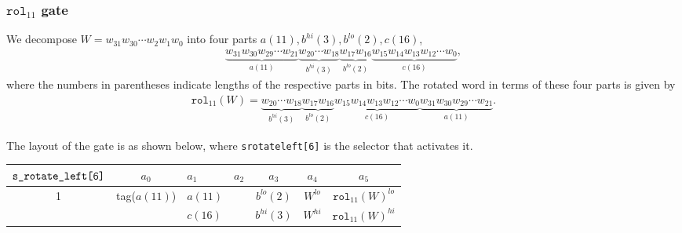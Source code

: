 \documentclass[10pt]{article}
\begin{document}
\subsubsection{$\texttt{rol}_{11}$ gate}%
\label{sec:rol_11_gate}
We decompose $W = w_{31}w_{30}\cdots w_2w_1w_0$ into four parts $a(11), b^{hi}(3), b^{lo}(2), c(16)$,
\begin{align*}
  \underbrace{w_{31}w_{30}w_{29}\cdots w_{21}}_{a(11)} \underbrace{w_{20}\cdots w_{18}}_{b^{hi}(3)}
  \underbrace{w_{17} w_{16}}_{b^{lo}(2)} \underbrace{w_{15}w_{14}w_{13}w_{12}\cdots w_{0}}_{c(16)},
\end{align*}
where the numbers in parentheses indicate lengths of the respective parts in bits. The rotated word in terms of these four parts is given by
\begin{align*}
  \texttt{rol}_{11}(W) = 
  \underbrace{w_{20}\cdots w_{18}}_{b^{hi}(3)} \underbrace{w_{17} w_{16}}_{b^{lo}(2)}
  \underbrace{w_{15}w_{14}w_{13}w_{12}\cdots w_{0}}_{c(16)}\underbrace{w_{31}w_{30}w_{29}\cdots w_{21}}_{a(11)}.
\end{align*}

The layout of the gate is as shown below, where \texttt{s\textunderscore rotate\textunderscore left[6]} is the selector that activates it.

\begin{center}
  \begin{tabular}{c|c|l|l|c|c|c}
    $\texttt{s\textunderscore rotate\textunderscore left[6]}$ & $a_0$ & $a_1$ & $a_2$ & $a_3$ & $a_4$ & $a_5$ \\ \hline
    1  & tag($a(11)$) & $a(11)$ &                        & $b^{lo}(2)$ & $W^{lo}$  & $\texttt{rol}_{11}(W)^{lo}$  \\ 
       &              & $c(16)$ &                        & $b^{hi}(3)$ & $W^{hi}$  & $\texttt{rol}_{11}(W)^{hi}$  \\ \hline
  \end{tabular}
\end{center}
\end{document}
